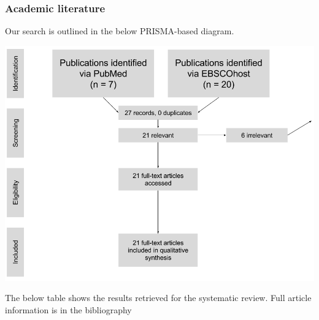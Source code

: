 \documentclass[]{article}
\begin{document}
\subsubsection{Academic literature}\label{academic-literature-1}

Our search is outlined in the below PRISMA-based diagram.

\begin{center}
\includegraphics[width=400pt]{img/prisma.png}
\end{center}

The below table shows the results retrieved for the systematic review.
Full article information is in the bibliography

\begingroup\fontsize{6pt}{7pt}\selectfont
\end{document}
